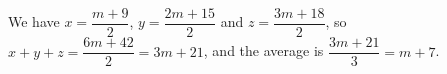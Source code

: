 We have $x=\dfrac{m+9}{2}$, $y=\dfrac{2m+15}{2}$ and $z=\dfrac{3m+18}{2}$, so $x+y+z=\dfrac{6m+42}{2}=3m+21$, and the average is $\dfrac{3m+21}{3}=\boxed{m+7}$.
